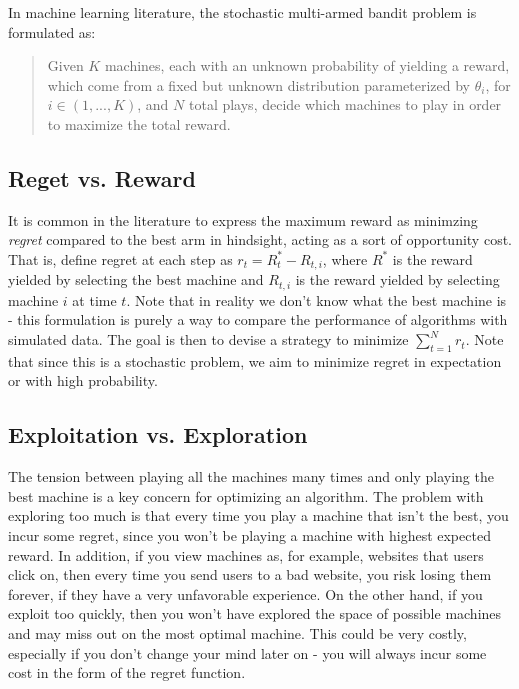 \documentclass{article}
\begin{document}
In machine learning literature, the stochastic multi-armed bandit problem is formulated as:

\begin{quote}
Given $K$ machines, each with an unknown probability of yielding a reward, which come from a fixed but unknown distribution parameterized by $\theta_i$, for $i \in (1, ..., K)$, and $N$ total plays, decide which machines to play in order to maximize the total reward.
\end{quote}

\subsection{Reget vs. Reward}

It is common in the literature to express the maximum reward as minimzing \textit{regret} compared to the best arm in hindsight, acting as a sort of opportunity cost. That is, define regret at each step as $r_{t} = R^*_{t} - R_{t,i}$, where $R^*$ is the reward yielded by selecting the best machine and $R_{t,i}$ is the reward yielded by selecting machine $i$ at time $t$. Note that in reality we don't know what the best machine is - this formulation is purely a way to compare the performance of algorithms with simulated data. The goal is then to devise a strategy to minimize $\sum_{t=1}^N r_{t}$. Note that since this is a stochastic problem, we aim to minimize regret in expectation or with high probability.\\

\subsection{Exploitation vs. Exploration}

The tension between playing all the machines many times and only playing the best machine is a key concern for optimizing an algorithm. The problem with exploring too much is that every time you play a machine that isn't the best, you incur some regret, since you won't be playing a machine with highest expected reward. In addition, if you view machines as, for example, websites that users click on, then every time you send users to a bad website, you risk losing them forever, if they have a very unfavorable experience. On the other hand, if you exploit too quickly, then you won't have explored the space of possible machines and may miss out on the most optimal machine. This could be very costly, especially if you don't change your mind later on - you will always incur some cost in the form of the regret function.\\
\end{document}
